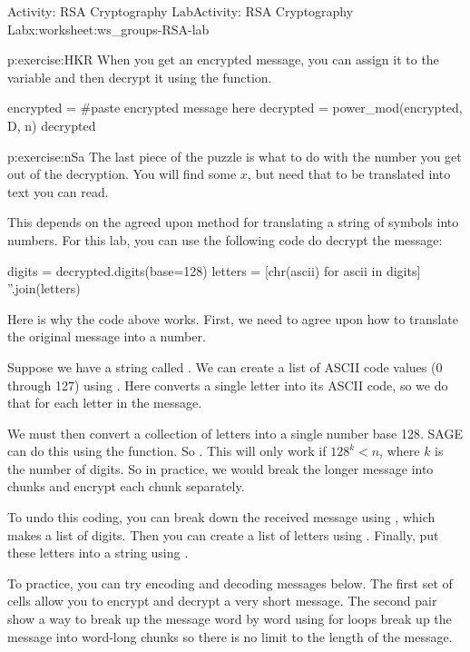 \documentclass[11pt]{book}
\begin{document}
\begin{worksheet-section}{Activity: RSA Cryptography Lab}{}{Activity: RSA Cryptography Lab}{}{}{x:worksheet:ws_groups-RSA-lab}
\begin{divisionexercise}{4}{}{}{p:exercise:HKR}%
When you get an encrypted message, you can assign it to the variable and then decrypt it using the function.%
\begin{sageinput}
encrypted = #paste encrypted message here
decrypted = power_mod(encrypted, D, n)
decrypted
\end{sageinput}
\end{divisionexercise}%
\begin{divisionexercise}{5}{}{}{p:exercise:nSa}%
The last piece of the puzzle is what to do with the number you get out of the decryption.  You will find some \(x\), but need that to be translated into text you can read.%
\par
This depends on the agreed upon method for translating a string of symbols into numbers.  For this lab, you can use the following code do decrypt the message:%
\begin{sageinput}
digits = decrypted.digits(base=128)
letters = [chr(ascii) for ascii in digits]
''.join(letters)
\end{sageinput}
\end{divisionexercise}%
Here is why the code above works.  First, we need to agree upon how to translate the original message into a number.%
\par
Suppose we have a string called .  We can create a list of ASCII code values (0 through 127) using .  Here converts a single letter into its ASCII code, so we do that for each letter in the message.%
\par
We must then convert a collection of letters into a single number base 128.  SAGE can do this using the function.  So .  This will only work if \(128^k \lt n\), where \(k\) is the number of digits.  So in practice, we would break the longer message into chunks and encrypt each chunk separately.%
\par
To undo this coding, you can break down the received message using , which makes a list of digits.  Then you can create a list of letters using .  Finally, put these letters into a string using .%
\par
To practice, you can try encoding and decoding messages below.   The first set of cells allow you to encrypt and decrypt a very short message. The second pair show a way to break up the message word by word using for loops break up the message into word-long chunks so there is no limit to the length of the message.%

\end{worksheet-section}
\end{document}
